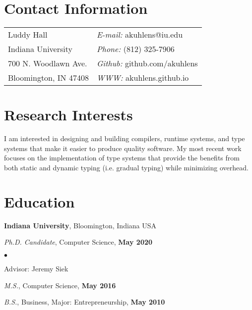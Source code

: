 \documentclass[resmargin,line]{res}
\newenvironment{list1}{
  \begin{list}{\ding{113}}{%
      \setlength{\itemsep}{0in}
      \setlength{\parsep}{0in} \setlength{\parskip}{0in}
      \setlength{\topsep}{0in} \setlength{\partopsep}{0in} 
      \setlength{\leftmargin}{0.17in}}}{\end{list}}
\newenvironment{list2}{
  \begin{list}{$\bullet$}{%
      \setlength{\itemsep}{0in}
      \setlength{\parsep}{0in} \setlength{\parskip}{0in}
      \setlength{\topsep}{0in} \setlength{\partopsep}{0in} 
      \setlength{\leftmargin}{0.2in}}}{\end{list}}
\begin{document}

\begin{resume}
\section{\sc Contact Information}
\vspace{.05in}
\begin{tabular}{@{}p{2in}p{4in}}
Luddy Hall                 & {\it E-mail:} akuhlens@iu.edu \\
Indiana University         & {\it Phone:}  (812) 325-7906 \\
700 N. Woodlawn Ave.       & {\it Github:} github.com/akuhlens  \\       
Bloomington, IN 47408      & {\it WWW:} akuhlens.github.io \\     
\end{tabular}

\section{\sc Research Interests}
I am interested in designing and building compilers, runtime systems,
and type systems that make it easier to produce quality software.  My
most recent work focuses on the implementation of type systems that
provide the benefits from both static and dynamic typing (i.e. gradual
typing) while minimizing overhead.

\section{\sc Education}
{\bf Indiana University},
Bloomington, Indiana USA\\
\vspace*{-.15in}
\begin{list1}
\item[] {\em Ph.D. Candidate}, Computer Science, \hfill {\bf May 2020}\\
  \vspace*{-.15in}
  \begin{list2}
  \item[] Advisor:  Jeremy Siek
  \end{list2}
\item[] {\em M.S.}, Computer Science,  \hfill {\bf May 2016}
\item[] {\em B.S.}, Business, Major: Entrepreneurship, \hfill{} {\bf May 2010}
\end{list1}


\end{resume}
\end{document}
